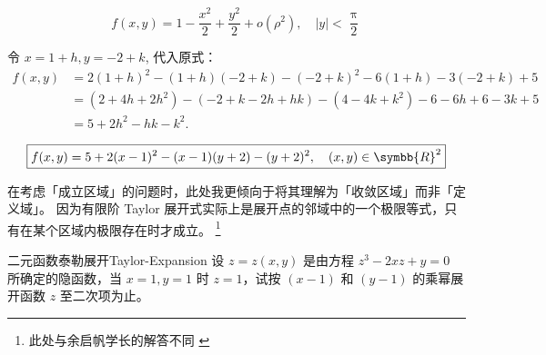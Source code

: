 \begin{solution}
    \begin{equation}
        \boxed{f(x, y) = 1 - \frac{x^2}{2} + \frac{y^2}{2} + o(\rho^2), \quad |y| < \frac{\uppi}{2}}
    \end{equation}


    令 $x = 1+h, y = -2+k$, 代入原式：
    \begin{equation}
        \begin{aligned}
            f(x, y) & = 2(1+h)^2 - (1+h)(-2+k) - (-2+k)^2 - 6(1+h) - 3(-2+k) + 5  \\
                    & = (2+4h+2h^2) - (-2+k-2h+hk) - (4-4k+k^2) - 6-6h + 6-3k + 5 \\
                    & = 5 + 2h^2 - hk - k^2.
        \end{aligned}
    \end{equation}

    \begin{equation}
        \boxed{f(x, y) = 5 + 2(x-1)^2 - (x-1)(y+2) - (y+2)^2, \quad (x, y) \in \symbb{R}^2}
    \end{equation}
\end{solution}

\begin{note}{}{}
    在考虑「成立区域」的问题时，此处我更倾向于将其理解为「收敛区域」而非「定义域」。
    因为有限阶 Taylor 展开式实际上是展开点的邻域中的一个极限等式，只有在某个区域内极限存在时才成立。
    \footnote{此处与余启帆学长的解答不同 \cite{Yu2021MathAnalysis}}
\end{note}


\begin{problem}{二元函数泰勒展开}{Taylor-Expansion}
    设 $z = z(x,y)$ 是由方程 $z^3 - 2xz + y = 0$ 所确定的隐函数，当 $x = 1, y = 1$ 时 $z = 1$，试按 $(x - 1)$ 和 $(y - 1)$ 的乘幂展开函数 $z$ 至二次项为止。
\end{problem}

